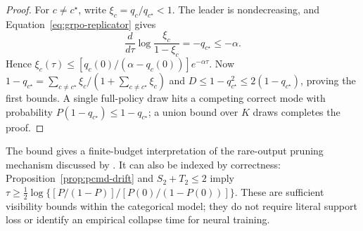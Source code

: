 \begin{proof}
\enforcehalffinalproseline
For $c\ne c^\star$, write $\xi_c=q_c/q_{c^\star}<1$.
The leader is nondecreasing, and Equation~\eqref{eq:grpo-replicator} gives
\[
 \frac{d}{d\tau}\log\frac{\xi_c}{1-\xi_c}
 =-q_{c^\star}\le-\alpha.
\]
Hence
$\xi_c(\tau)\le[q_c(0)/(\alpha-q_c(0))]e^{-\alpha\tau}$.
Now $1-q_{c^\star}=\sum_{c\ne c^\star}\xi_c/(1+\sum_{c\ne c^\star}\xi_c)$
and $D\le1-q_{c^\star}^2\le2(1-q_{c^\star})$, proving the first bounds.
A single full-policy draw hits a competing correct mode with probability
$P(1-q_{c^\star})\le1-q_{c^\star}$; a union bound over $K$ draws completes
the proof.
\end{proof}

The bound gives a finite-budget interpretation of the rare-output pruning
mechanism discussed by \citet[Section~4.2.5]{lochab2026ucpo}.
It can also be indexed by correctness: Proposition~\ref{prop:pcmd-drift}
and $S_2+T_2\le2$ imply
$\tau\ge\tfrac12\log\{[P/(1-P)]/[P(0)/(1-P(0))]\}$.
These are sufficient visibility bounds within the categorical model;
they do not require literal support loss or identify an empirical collapse
time for neural training.


